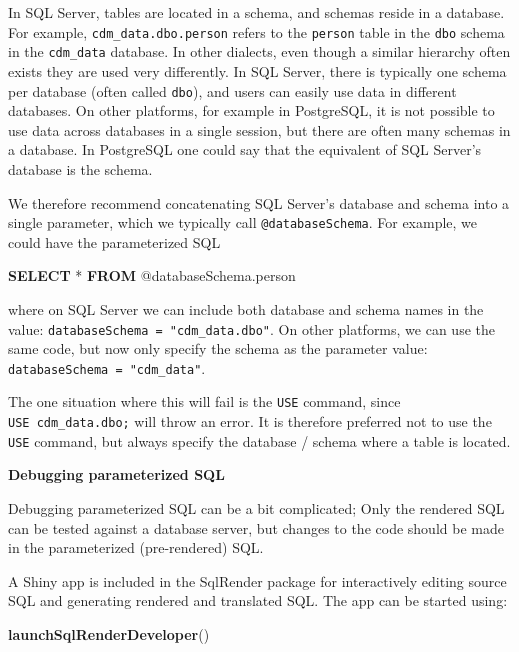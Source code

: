 \documentclass[]{book}
\newenvironment{Shaded}{\begin{snugshade}}{\end{snugshade}}
\newcommand{\KeywordTok}[1]{\textcolor[rgb]{0.13,0.29,0.53}{\textbf{#1}}}
\newcommand{\NormalTok}[1]{#1}
\begin{document}
In SQL Server, tables are located in a schema, and schemas reside in a
database. For example, \texttt{cdm\_data.dbo.person} refers to the
\texttt{person} table in the \texttt{dbo} schema in the
\texttt{cdm\_data} database. In other dialects, even though a similar
hierarchy often exists they are used very differently. In SQL Server,
there is typically one schema per database (often called \texttt{dbo}),
and users can easily use data in different databases. On other
platforms, for example in PostgreSQL, it is not possible to use data
across databases in a single session, but there are often many schemas
in a database. In PostgreSQL one could say that the equivalent of SQL
Server's database is the schema.

We therefore recommend concatenating SQL Server's database and schema
into a single parameter, which we typically call
\texttt{@databaseSchema}. For example, we could have the parameterized
SQL

\begin{Shaded}
\begin{Highlighting}[]
\KeywordTok{SELECT}\NormalTok{ * }\KeywordTok{FROM}\NormalTok{ @databaseSchema.person}
\end{Highlighting}
\end{Shaded}

where on SQL Server we can include both database and schema names in the
value: \texttt{databaseSchema\ =\ "cdm\_data.dbo"}. On other platforms,
we can use the same code, but now only specify the schema as the
parameter value: \texttt{databaseSchema\ =\ "cdm\_data"}.

The one situation where this will fail is the \texttt{USE} command,
since \texttt{USE\ cdm\_data.dbo;} will throw an error. It is therefore
preferred not to use the \texttt{USE} command, but always specify the
database / schema where a table is located.

\textbf{Debugging parameterized SQL}

Debugging parameterized SQL can be a bit complicated; Only the rendered
SQL can be tested against a database server, but changes to the code
should be made in the parameterized (pre-rendered) SQL.

A Shiny app is included in the SqlRender package for interactively
editing source SQL and generating rendered and translated SQL. The app
can be started using:

\begin{Shaded}
\begin{Highlighting}[]
\KeywordTok{launchSqlRenderDeveloper}\NormalTok{()}
\end{Highlighting}
\end{Shaded}
\end{document}
